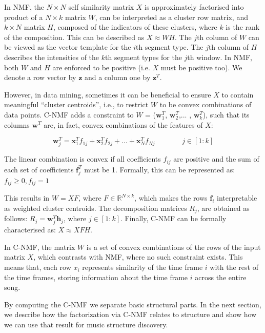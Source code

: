 In NMF, the $N \times N$ self similarity matrix $X$ is approximately factorised into product of a $N \times k$ matrix $W$, can be interpreted as a cluster row matrix, and $k \times N$ matrix $H$, composed of the indicators of these clusters, where $k$ is the rank of the composition. This can be described as $X \approx WH$. The $j$th column of $W$ can be viewed as the vector template for the $i$th segment type. The $j$th column of $H$ describes the intensities of the $k$th segment types for the $j$th window. In NMF, both $W$ and $H$ are enforced to be positive (i.e. $X$ must be positive too). We denote a row vector by $\boldsymbol{z}$ and a column one by $\boldsymbol{z}^{T}$.

However, in data mining, sometimes it can be beneficial to ensure $X$ to contain meaningful “cluster centroids”, i.e., to restrict $W$ to be convex combinations of data points.
C-NMF adds a constraint to $W$ = ($\boldsymbol{w}_{1}^{T}$, $\boldsymbol{w}_{2}^{T}$,... ,  $\boldsymbol{w}_{k}^{T}$),  such that its columns  $\boldsymbol{w}^{T}$  are, in fact,  convex combinations of the features of $X$:

\begin{equation}
\boldsymbol{w}_{j}^{T} = \boldsymbol{x}_{1}^{T}f_{1j} + \boldsymbol{x}_{2}^{T}f_{2j} + ... + \boldsymbol{x}_{N}^{T}f_{Nj}  \hspace{45pt}   j \in [1 : k]
\end{equation}

The linear combination is convex if all coefficients $f_{ij}$ are positive and the sum of each set of coefficients  $\boldsymbol{f}^{T}_{j}$ must be 1. Formally, this can be represented as:
$f_{ij} \geq 0,  f_{ij} = 1 $

This results in $W = XF$, where $F \in \mathbb{R}^{N \times k}$, which makes the rows $\boldsymbol{f}_{i}$ interpretable as weighted cluster centroids. The decomposition matrices $R_{j}$, are obtained as follows:  $R_{j} =  \boldsymbol{w}^{T}_{j}\boldsymbol{h}_{j}$, where $j \in [1 : k]$. Finally, C-NMF can be formally characterised as: $X \approx XFH$.

In C-NMF, the matrix $W$ is a set of convex combinations of the rows of the input matrix $X$, which contrasts with NMF, where no such constraint exists. This means that, each row $x_{i}$ represents similarity of the time frame $i$ with the rest of the time frames, storing information about the time frame $i$ across the entire song.

By computing the C-NMF we separate basic structural parts. In the next section, we describe how the factorization via C-NMF relates to structure and show how we can use that result for music structure discovery. 

